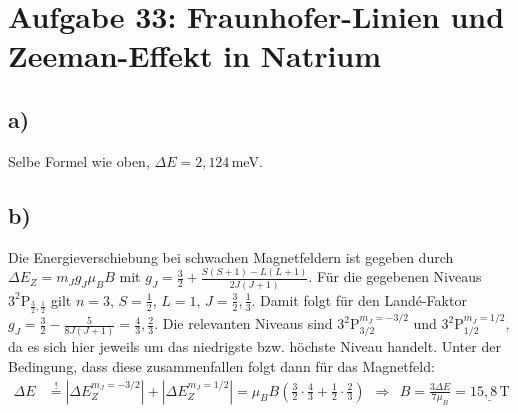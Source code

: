 \documentclass[a4paper,12pt]{article}
\newcommand{\kla}{}
\newcommand{\tecxt}{}
\begin{document}
\section*{Aufgabe 33: Fraunhofer-Linien und Zeeman-Effekt in Natrium}
\subsection*{a)}
Selbe Formel wie oben, $\Delta E=2,124\,$meV.
\subsection*{b)}
Die Energieverschiebung bei schwachen Magnetfeldern ist gegeben durch $\Delta E_Z=m_Jg_J\mu_BB$ mit $g_J=\frac{3}{2}+\frac{S(S+1)-L(L+1)}{2J(J+1)}$. Für die gegebenen Niveaus $3^2\tecxt\text{P}_{\frac{3}{2},\frac{1}{2}}$ gilt $n=3$, $S=\frac{1}{2}$, $L=1$, $J=\frac{3}{2},\frac{1}{3}$. Damit folgt für den Landé-Faktor $g_J=\frac{3}{2}-\frac{5}{8J(J+1)}=\frac{4}{3},\frac{2}{3}$. Die relevanten Niveaus sind $3^2\tecxt\text{P}_{3/2}^{m_J=-3/2}$ und $3^2\tecxt\text{P}_{1/2}^{m_J=1/2}$, da es sich hier jeweils um das niedrigste bzw. höchste Niveau handelt. Unter der Bedingung, dass diese zusammenfallen folgt dann für das Magnetfeld:
\begin{align*}
\Delta E&\overset{!}{=}|\Delta E_Z^{m_J=-3/2}|+|\Delta E_Z^{m_J=1/2}|=\mu_BB\kla\left( {\frac{3}{2}\cdot\frac{4}{3}+\frac{1}{2}\cdot\frac{2}{3}} \right)\ \ \Rightarrow\ \ B=\frac{3\Delta E}{7\mu_B}=\underline{15,8\,\tecxt\text{T}}
\end{align*}
\end{document}
